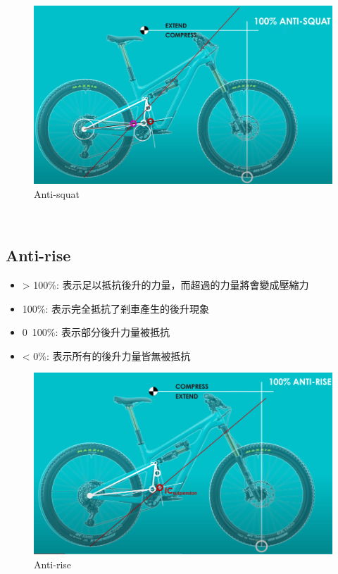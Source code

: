 \documentclass[14pt,a4paper]{report}  %
\newcommand{\fourteen}{\fontsize{14pt}{\baselineskip}\selectfont}%
\begin{document}
     \begin{figure}[hbt!]
       \centering
       \includegraphics[scale=0.4]{anti-squat.PNG}
       \caption{Anti-squat}
       \label{fig_anti-squat:scale}
    \end{figure}
       
       \hspace*{\fill} \\
       \subsection{Anti-rise}
       \fourteen {在剎車的時候因為力量轉移的關係導致後輪產生升起的情況，而Anti-rise即為抵抗此後升現象的能力。}
       \begin{itemize}
       \item > 100\%: 表示足以抵抗後升的力量，而超過的力量將會變成壓縮力
       \item 100\%: 表示完全抵抗了剎車產生的後升現象
       \item 0~100\%: 表示部分後升力量被抵抗
       \item < 0\%: 表示所有的後升力量皆無被抵抗
       \end{itemize}
	\begin{figure}[hbt!]
       \centering
       \includegraphics[scale=0.45]{anti-rise.PNG}
       \caption{Anti-rise}
       \label{fig_anti-rise:scale}
    \end{figure}
       
\end{document}
